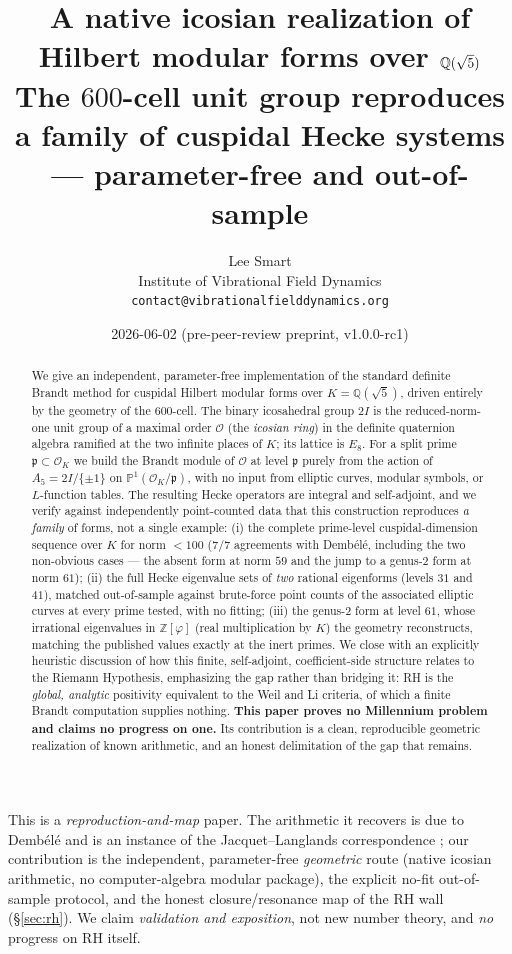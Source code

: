 \documentclass[11pt,a4paper]{article}
\title{\textbf{A native icosian realization of Hilbert modular forms
over $\Q(\sqrt5)$}\\[0.4em]
\large The $600$-cell unit group reproduces a family of cuspidal Hecke
systems --- parameter-free and out-of-sample}
\author{Lee Smart\\
\small Institute of Vibrational Field Dynamics\\
\small \texttt{contact@vibrationalfielddynamics.org}}
\date{2026-06-02 \quad (pre-peer-review preprint, v1.0.0-rc1)}
\newcommand{\Q}{\mathbb{Q}}
\newcommand{\Z}{\mathbb{Z}}
\newcommand{\PP}{\mathbb{P}}
\newcommand{\Ord}{\mathcal{O}}
\newcommand{\fp}{\mathfrak{p}}
\newcommand{\OK}{\Ord_K}
\begin{document}
\maketitle

\begin{abstract}
\noindent
We give an independent, parameter-free implementation of the standard
definite Brandt method for cuspidal Hilbert modular forms over
$K=\Q(\sqrt5)$, driven entirely by the geometry of the $600$-cell. The
binary icosahedral group $2I$ is the reduced-norm-one unit group of a
maximal order $\Ord$ (the \emph{icosian ring}) in the definite
quaternion algebra ramified at the two infinite places of $K$; its
lattice is $E_8$. For a split prime $\fp\subset\OK$ we build the Brandt
module of $\Ord$ at level $\fp$ purely from the action of
$A_5=2I/\{\pm1\}$ on $\PP^1(\OK/\fp)$, with no input from elliptic
curves, modular symbols, or $L$-function tables. The resulting Hecke
operators are integral and self-adjoint, and we verify against
independently point-counted data that this construction reproduces
\emph{a family} of forms, not a single example:
(i) the complete prime-level cuspidal-dimension sequence over $K$ for
norm ${<}100$ ($7/7$ agreements with Demb\'el\'e, including the two
non-obvious cases --- the absent form at norm $59$ and the jump to a
genus-$2$ form at norm $61$);
(ii) the full Hecke eigenvalue sets of \emph{two} rational eigenforms
(levels $31$ and $41$), matched out-of-sample against brute-force point
counts of the associated elliptic curves at every prime tested, with no
fitting;
(iii) the genus-$2$ form at level $61$, whose irrational eigenvalues in
$\Z[\varphi]$ (real multiplication by $K$) the geometry reconstructs,
matching the published values exactly at the inert primes.
We close with an explicitly heuristic discussion of how this finite,
self-adjoint, coefficient-side structure relates to the Riemann
Hypothesis, emphasizing the gap rather than bridging it: RH is the
\emph{global, analytic} positivity equivalent to the Weil and Li
criteria, of which a finite Brandt computation supplies nothing.
\textbf{This paper proves no Millennium problem and claims no progress
on one.} Its contribution is a clean, reproducible geometric realization
of known arithmetic, and an honest delimitation of the gap that remains.
\end{abstract}

\begin{scopebox}
This is a \emph{reproduction-and-map} paper. The arithmetic it recovers
is due to Demb\'el\'e \cite{Dembele2005} and is an instance of the
Jacquet--Langlands correspondence \cite{JacquetLanglands1970,
Eichler1973}; our contribution is the independent, parameter-free
\emph{geometric} route (native icosian arithmetic, no computer-algebra
modular package), the explicit no-fit out-of-sample protocol, and the
honest closure/resonance map of the RH wall (\S\ref{sec:rh}). We claim
\emph{validation and exposition}, not new number theory, and \emph{no}
progress on RH itself.
\end{scopebox}
\end{document}
